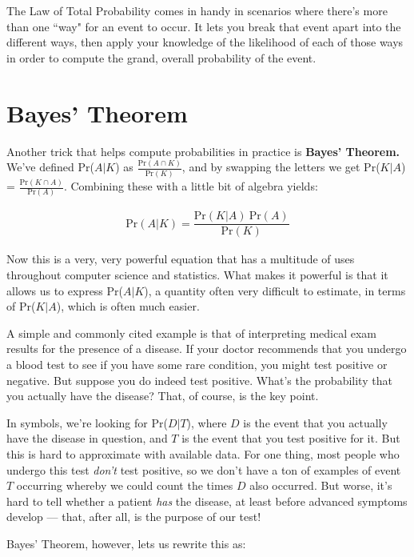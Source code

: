 The Law of Total Probability comes in handy in scenarios where there's more
than one ``way" for an event to occur. It lets you break that event apart
into the different ways, then apply your knowledge of the likelihood of
each of those ways in order to compute the grand, overall probability of
the event.


\section{Bayes' Theorem}

Another trick that helps compute probabilities in practice is
\textbf{Bayes' Theorem.} We've defined Pr($A|K$) as $\frac{\text{Pr}(A \cap
K)}{\text{Pr}(K)}$, and by swapping the letters we get Pr($K|A$) =
$\frac{\text{Pr}(K \cap A)}{\text{Pr}(A)}$. Combining these with a little
bit of algebra yields:

\begin{align*}
\text{Pr}(A|K) = \dfrac{\text{Pr}(K|A) \ \text{Pr}(A)}{\text{Pr}(K)}
\end{align*}

Now this is a very, very powerful equation that has a multitude of uses
throughout computer science and statistics. What makes it powerful is that
it allows us to express Pr($A|K$), a quantity often very difficult to
estimate, in terms of Pr($K|A$), which is often much easier.

A simple and commonly cited example is that of interpreting medical exam
results for the presence of a disease. If your doctor recommends that you
undergo a blood test to see if you have some rare condition, you might test
positive or negative. But suppose you do indeed test positive. What's the
probability that you actually have the disease? That, of course, is the key
point.

In symbols, we're looking for Pr($D|T$), where $D$ is the event that you
actually have the disease in question, and $T$ is the event that you test
positive for it. But this is hard to approximate with available data. For
one thing, most people who undergo this test \textit{don't} test positive,
so we don't have a ton of examples of event $T$ occurring whereby we could
count the times $D$ also occurred. But worse, it's hard to tell whether a
patient \textit{has} the disease, at least before advanced symptoms develop
--- that, after all, is the purpose of our test!

Bayes' Theorem, however, lets us rewrite this as:


